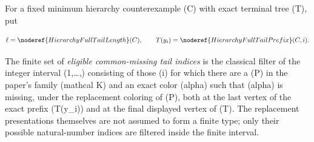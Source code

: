 \begin{definition}
For a fixed minimum hierarchy counterexample (C) with exact terminal
tree (T), put

\[
 \ell=\noderef{HierarchyFullTailLength}(C),\qquad
 T(y_i)=\noderef{HierarchyFullTailPrefix}(C,i).
\]

The finite set of \emph{eligible common-missing tail indices} is the
classical filter of the integer interval ({1,\ldots,}) consisting
of those (i) for which there are a
 (P) in the paper's family
(mathcal K) and an exact color (alpha) such that (alpha) is missing,
under the replacement coloring of (P), both at the last vertex of the
exact prefix (T(y_i)) and at the final displayed vertex of (T).
The replacement presentations themselves are not assumed to form a finite
type; only their possible natural-number indices are filtered inside the
finite interval.
\end{definition}
